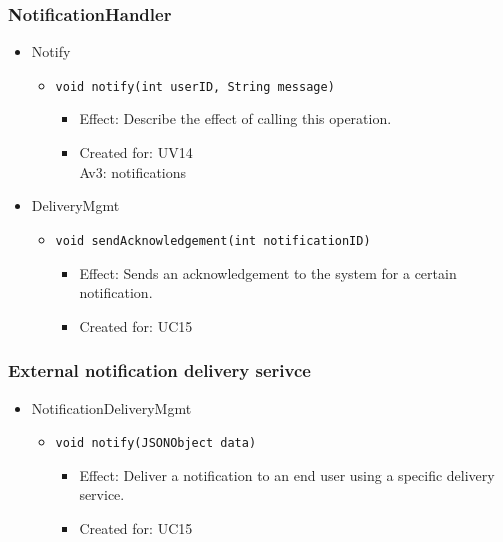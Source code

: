     \subsubsection{NotificationHandler}
        \begin{itemize}
            \item Notify
            \begin{itemize}
                \item \texttt{void notify(int userID, String message)}
                \begin{itemize}
                    \item Effect: Describe the effect of calling this operation.
                    \item Created for: UV14 \\
                          Av3: notifications
                \end{itemize}
            \end{itemize}

            \item DeliveryMgmt
            \begin{itemize}
                \item \texttt{void sendAcknowledgement(int notificationID)}
                \begin{itemize}
                    \item Effect: Sends an acknowledgement to the system for a certain notification.
                    \item Created for: UC15
                \end{itemize}
            \end{itemize}
        \end{itemize}

    \subsubsection{External notification delivery serivce}
        \begin{itemize}
            \item NotificationDeliveryMgmt
            \begin{itemize}
                \item \texttt{void notify(JSONObject data)}
                \begin{itemize}
                    \item Effect: Deliver a notification to an end user using a specific delivery service.
                    \item Created for: UC15
                \end{itemize}
            \end{itemize}
        \end{itemize}

